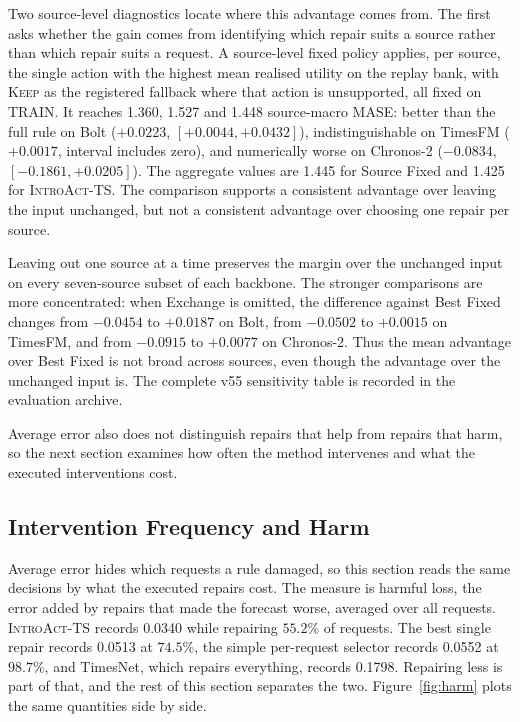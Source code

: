 \documentclass{article}
\newcommand{\introact}{\textsc{IntroAct-TS}}
\begin{document}
Two source-level diagnostics locate where this advantage comes from. The first asks whether
the gain comes from identifying which repair suits a source rather than which repair suits a
request. A source-level fixed policy applies, per source, the single action with the highest
mean realised utility on the replay bank, with \textsc{Keep} as the registered fallback where
that action is unsupported, all fixed on TRAIN. It reaches 1.360, 1.527 and 1.448 source-macro
MASE: better than the full rule on Bolt ($+0.0223$, $[+0.0044,+0.0432]$),
indistinguishable on TimesFM ($+0.0017$, interval includes zero), and numerically worse on
Chronos-2 ($-0.0834$, $[-0.1861,+0.0205]$). The aggregate values are 1.445 for Source Fixed
and 1.425 for \introact{}. The comparison supports a consistent advantage over leaving the
input unchanged, but not a consistent advantage over choosing one repair per source.

Leaving out one source at a time preserves the margin over the unchanged input on every
seven-source subset of each backbone. The stronger comparisons are more concentrated: when
Exchange is omitted, the difference against Best Fixed changes from $-0.0454$ to $+0.0187$
on Bolt, from $-0.0502$ to $+0.0015$ on TimesFM, and from $-0.0915$ to $+0.0077$ on
Chronos-2. Thus the mean advantage over Best Fixed is not broad across sources, even though
the advantage over the unchanged input is. The complete v55 sensitivity table is recorded
in the evaluation archive.

Average error also does not distinguish repairs that help from repairs that harm, so the next
section examines how often the method intervenes and what the executed interventions cost.

\subsection{Intervention Frequency and Harm}
\label{sec:exp-harm}
Average error hides which requests a rule damaged, so this section reads the same decisions by
what the executed repairs cost. The measure is harmful loss, the error added by repairs that
made the forecast worse, averaged over all requests. \introact{} records 0.0340 while
repairing $55.2\%$ of requests. The best single repair records 0.0513 at $74.5\%$, the simple
per-request selector records 0.0552 at $98.7\%$, and TimesNet, which repairs everything,
records 0.1798. Repairing less is part of that, and the rest of this section separates the
two. Figure~\ref{fig:harm} plots the same quantities side by side.
\end{document}
